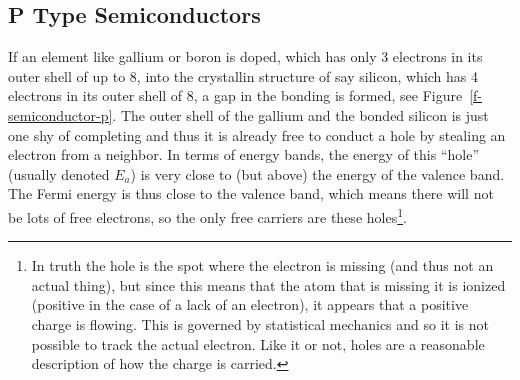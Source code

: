 






\subsection{P Type Semiconductors}
If an element like gallium or boron is doped, which has only 3 electrons in its outer shell of up to 8, into the crystallin structure of say silicon, which has 4 electrons in its outer shell of 8, a gap in the bonding is formed, see Figure~\ref{f-semiconductor-p}.  The outer shell of the gallium and the bonded silicon is just one shy of completing and thus it is already free to conduct a hole by stealing an electron from a neighbor.  In terms of energy bands, the energy of this ``hole'' (usually denoted $E_a$) is very close to (but above) the energy of the valence band.  The Fermi energy is thus close to the valence band, which means there will not be lots of free electrons, so the only free carriers are these holes\footnote{In truth the hole is the spot where the electron is missing (and thus not an actual thing), but since this means that the atom that is missing it is ionized (positive in the case of a lack of an electron), it appears that a positive charge is flowing.  This is governed by statistical mechanics and so it is not possible to track the actual electron.  Like it or not, holes are a reasonable description of how the charge is carried.}.

